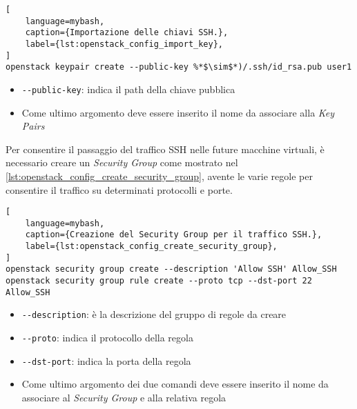 \begin{lstlisting}[
    language=mybash, 
    caption={Importazione delle chiavi SSH.},
    label={lst:openstack_config_import_key},
]
openstack keypair create --public-key %*$\sim$*)/.ssh/id_rsa.pub user1
\end{lstlisting}
\begin{itemize}
    \item \verb|--public-key|: indica il path della chiave pubblica
        
    \item Come ultimo argomento deve essere inserito il nome da associare alla \emph{Key Pairs}
\end{itemize}

\noindent
Per consentire il passaggio del traffico SSH nelle future macchine virtuali, è necessario creare un \emph{Security Group} come mostrato nel \cref{lst:openstack_config_create_security_group}, avente le varie regole per consentire il traffico su determinati protocolli e porte.
\begin{lstlisting}[
    language=mybash, 
    caption={Creazione del Security Group per il traffico SSH.},
    label={lst:openstack_config_create_security_group},
]
openstack security group create --description 'Allow SSH' Allow_SSH
openstack security group rule create --proto tcp --dst-port 22 Allow_SSH
\end{lstlisting}
\begin{itemize}
    \item \verb|--description|: è la descrizione del gruppo di regole da creare
        
    \item \verb|--proto|: indica il protocollo della regola
        
    \item \verb|--dst-port|: indica la porta della regola
        
    \item Come ultimo argomento dei due comandi deve essere inserito il nome da associare al \emph{Security Group} e alla relativa regola
\end{itemize}




